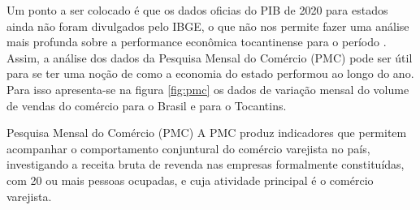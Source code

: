 \par Um ponto a ser colocado é que os dados oficias do PIB de 2020 para estados ainda não foram divulgados pelo IBGE, o que não nos permite fazer uma análise mais profunda sobre a performance econômica tocantinense para o período . Assim, a análise dos dados da Pesquisa Mensal do Comércio (PMC) pode ser útil para se ter uma noção de como a economia do estado performou ao longo do ano. Para isso apresenta-se na figura \ref{fig:pmc} os dados de variação mensal do volume de vendas do comércio para o Brasil e para o Tocantins.

 \begin{smbox}[label={labelbox},nameref={Pesquisa Mensal do Comércio(PMC)}]{Pesquisa Mensal do Comércio (PMC)}
	A PMC produz indicadores que permitem acompanhar o comportamento conjuntural do comércio varejista no país, investigando a receita bruta de revenda nas empresas formalmente constituídas, com 20 ou mais pessoas ocupadas, e cuja atividade principal é o comércio varejista.
 \end{smbox}

